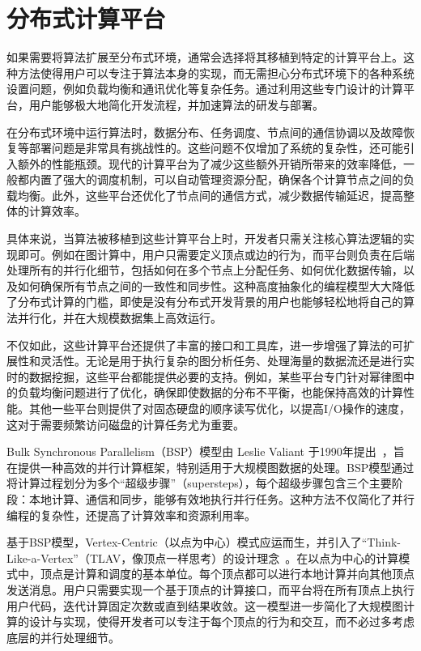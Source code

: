 	
\section{分布式计算平台}

如果需要将算法扩展至分布式环境，通常会选择将其移植到特定的计算平台上。这种方法使得用户可以专注于算法本身的实现，而无需担心分布式环境下的各种系统设置问题，例如负载均衡和通讯优化等复杂任务。通过利用这些专门设计的计算平台，用户能够极大地简化开发流程，并加速算法的研发与部署。

在分布式环境中运行算法时，数据分布、任务调度、节点间的通信协调以及故障恢复等部署问题是非常具有挑战性的。这些问题不仅增加了系统的复杂性，还可能引入额外的性能瓶颈。现代的计算平台为了减少这些额外开销所带来的效率降低，一般都内置了强大的调度机制，可以自动管理资源分配，确保各个计算节点之间的负载均衡。此外，这些平台还优化了节点间的通信方式，减少数据传输延迟，提高整体的计算效率。

具体来说，当算法被移植到这些计算平台上时，开发者只需关注核心算法逻辑的实现即可。例如在图计算中，用户只需要定义顶点或边的行为，而平台则负责在后端处理所有的并行化细节，包括如何在多个节点上分配任务、如何优化数据传输，以及如何确保所有节点之间的一致性和同步性。这种高度抽象化的编程模型大大降低了分布式计算的门槛，即使是没有分布式开发背景的用户也能够轻松地将自己的算法并行化，并在大规模数据集上高效运行。

不仅如此，这些计算平台还提供了丰富的接口和工具库，进一步增强了算法的可扩展性和灵活性。无论是用于执行复杂的图分析任务、处理海量的数据流还是进行实时的数据挖掘，这些平台都能提供必要的支持。例如，某些平台专门针对幂律图中的负载均衡问题进行了优化，确保即使数据的分布不平衡，也能保持高效的计算性能。其他一些平台则提供了对固态硬盘的顺序读写优化，以提高I/O操作的速度，这对于需要频繁访问磁盘的计算任务尤为重要。

Bulk Synchronous Parallelism（BSP）模型由 Leslie Valiant 于1990年提出~\cite{valiant1990bridging}，旨在提供一种高效的并行计算框架，特别适用于大规模图数据的处理。BSP模型通过将计算过程划分为多个“超级步骤”（supersteps），每个超级步骤包含三个主要阶段：本地计算、通信和同步，能够有效地执行并行任务。这种方法不仅简化了并行编程的复杂性，还提高了计算效率和资源利用率。

基于BSP模型，Vertex-Centric（以点为中心）模式应运而生，并引入了“Think-Like-a-Vertex”（TLAV，像顶点一样思考）的设计理念~\cite{mccune2015thinking}。在以点为中心的计算模式中，顶点是计算和调度的基本单位。每个顶点都可以进行本地计算并向其他顶点发送消息。用户只需要实现一个基于顶点的计算接口，而平台将在所有顶点上执行用户代码，迭代计算固定次数或直到结果收敛。这一模型进一步简化了大规模图计算的设计与实现，使得开发者可以专注于每个顶点的行为和交互，而不必过多考虑底层的并行处理细节。

